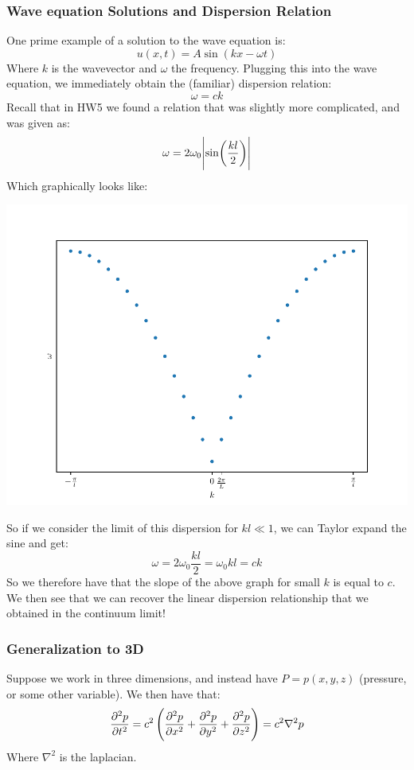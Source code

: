 \documentclass[../PHYS306Notes.tex]{subfiles}
\begin{document}
\subsubsection{Wave equation Solutions and Dispersion Relation}
One prime example of a solution to the wave equation is:
\[u(x, t) = A\sin(kx - \omega t)\]
Where $k$ is the wavevector and $\omega$ the frequency. Plugging this into the wave equation, we immediately obtain the (familiar) dispersion relation:
\[\omega = ck\]
Recall that in HW5 we found a relation that was slightly more complicated, and was given as:
\[\omega = 2\omega_0\abs{\sin(\frac{kl}{2})}\]
Which graphically looks like:
\begin{center}
    \includegraphics[scale=0.8]{Lecture-30/l30-img3.pdf}
\end{center}
So if we consider the limit of this dispersion for $kl \ll 1$, we can Taylor expand the sine and get:
\[\omega = 2\omega_0 \frac{kl}{2} = \omega_0 kl = ck\]
So we therefore have that the slope of the above graph for small $k$ is equal to $c$. We then see that we can recover the linear dispersion relationship that we obtained in the continuum limit!

\subsubsection{Generalization to 3D}
Suppose we work in three dimensions, and instead have $P = p(x, y, z)$ (pressure, or some other variable). We then have that:
\[\dpd[2]{p}{t} = c^2\left(\dpd[2]{p}{x} + \dpd[2]{p}{y} + \dpd[2]{p}{z}\right) = c^2\nabla^2 p\]
Where $\nabla^2$ is the laplacian.
\end{document}
